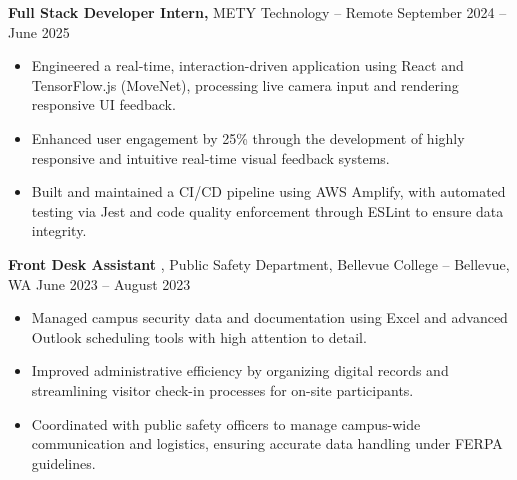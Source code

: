 \documentclass[11pt]{article}       %
\begin{document}
\textbf{Full Stack Developer Intern,} {METY Technology} -- Remote \hfill September 2024 -- June 2025 
\vspace{-9pt}
\begin{itemize}
  \item Engineered a real-time, interaction-driven application using React and TensorFlow.js (MoveNet), processing live camera input and rendering responsive UI feedback.
  \item Enhanced user engagement by 25\% through the development of highly responsive and intuitive real-time visual feedback systems.
  \item Built and maintained a CI/CD pipeline using AWS Amplify, with automated testing via Jest and code quality enforcement through ESLint to ensure data integrity.
\end{itemize}

\textbf{Front Desk Assistant} {, Public Safety Department, Bellevue College} -- Bellevue, WA \hfill June 2023 -- August 2023 \\
\vspace{-9pt}
\begin{itemize}
  \item Managed campus security data and documentation using Excel and advanced Outlook scheduling tools with high attention to detail.
  \item Improved administrative efficiency by organizing digital records and streamlining visitor check-in processes for on-site participants.
  \item Coordinated with public safety officers to manage campus-wide communication and logistics, ensuring accurate data handling under FERPA guidelines.
\end{itemize}

\end{document}
